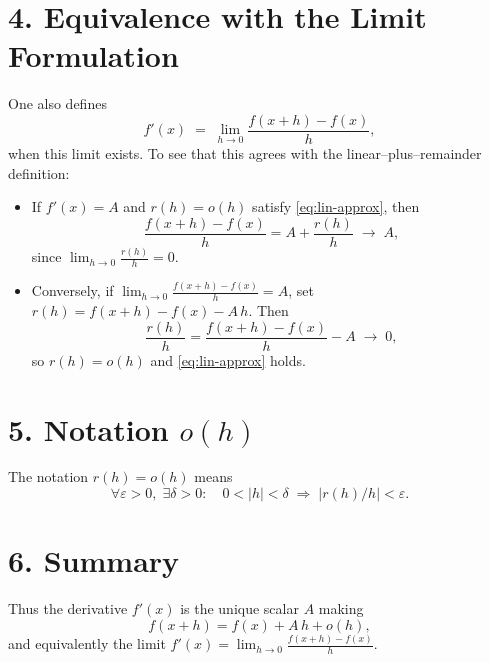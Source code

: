\documentclass[11pt,openany]{article}
\begin{document}
\section*{4. Equivalence with the Limit Formulation}

One also defines
\[
f'(x) \;=\;\lim_{h\to0}\frac{f(x+h)-f(x)}{h},
\]
when this limit exists.  To see that this agrees with the linear–plus–remainder definition:
\begin{itemize}
	\item If $f'(x)=A$ and $r(h)=o(h)$ satisfy \eqref{eq:lin-approx}, then
	\[
	\frac{f(x+h)-f(x)}{h}
	= A + \frac{r(h)}{h}
	\;\longrightarrow\; A,
	\]
	since $\displaystyle\lim_{h\to0}\tfrac{r(h)}{h}=0$.
	\item Conversely, if $\lim_{h\to0}\tfrac{f(x+h)-f(x)}{h}=A$, set
	$r(h)=f(x+h)-f(x)-A\,h$.  Then
	\[
	\frac{r(h)}{h}
	= \frac{f(x+h)-f(x)}{h} - A
	\;\longrightarrow\; 0,
	\]
	so $r(h)=o(h)$ and \eqref{eq:lin-approx} holds.
\end{itemize}

\section*{5. Notation $o(h)$}

The notation $r(h)=o(h)$ means
\[
\forall\varepsilon>0,\;\exists\delta>0:
\quad
0<|h|<\delta
\;\Longrightarrow\;
\bigl|r(h)/h\bigr|<\varepsilon.
\]

\section*{6. Summary}

Thus the derivative $f'(x)$ is the unique scalar $A$ making
\[
f(x+h) = f(x) + A\,h + o(h),
\]
and equivalently the limit $\displaystyle f'(x)=\lim_{h\to0}\tfrac{f(x+h)-f(x)}{h}$.
\end{document}
